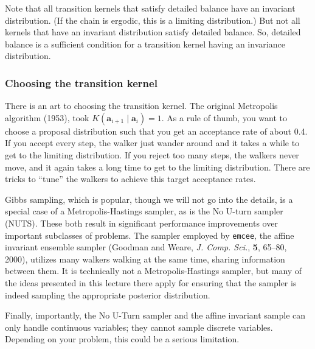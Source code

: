 Note that all transition kernels that satisfy detailed balance have an
invariant distribution.  (If the chain is ergodic, this is a limiting
distribution.)  But not all kernels that have an invariant
distribution satisfy detailed balance.  So, detailed balance is a
sufficient condition for a transition kernel having an invariance
distribution.


\subsubsection{Choosing the transition kernel}
There is an art to choosing the transition kernel.  The original
Metropolis algorithm (1953), took
$K(\mathbf{a}_{i+1}\mid \mathbf{a}_i) = 1$. As a rule of thumb, you want to choose a proposal distribution such that you get an acceptance rate of about 0.4. If you accept every step, the walker just wander around and it takes a while to get to the limiting distribution. If you reject too many steps, the walkers never move, and it again takes a long time to get to the limiting distribution. There are tricks to ``tune'' the walkers to achieve this target acceptance rates.

Gibbs sampling, which is
popular, though we will not go into the details, is a special case of
a Metropolis-Hastings sampler, as is the No U-turn sampler (NUTS).
These both result in significant performance improvements over
important subclasses of problems.  The sampler employed by
\texttt{emcee}, the affine invariant ensemble sampler (Goodman and
Weare, \textit{J. Comp. Sci.}, \textbf{5}, 65--80, 2000), utilizes
many walkers walking at the same time, sharing information between
them.  It is technically not a Metropolis-Hastings sampler, but many
of the ideas presented in this lecture there apply for ensuring that
the sampler is indeed sampling the appropriate posterior distribution.

Finally, importantly, the No U-Turn sampler and the affine invariant sample can only handle continuous variables; they cannot sample discrete variables. Depending on your problem, this could be a serious limitation.
